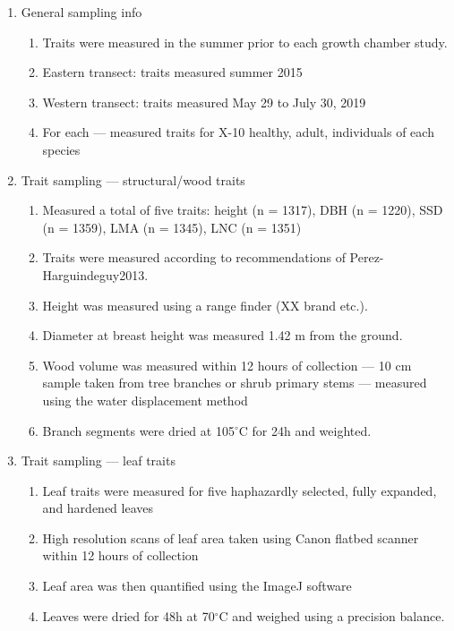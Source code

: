 \documentclass{article}
\begin{document}
\begin{enumerate}
\item General sampling info
\begin{enumerate}
\item Traits were measured in the summer prior to each growth chamber study.
\item Eastern transect: traits measured summer 2015 
\item Western transect: traits measured May 29 to July 30, 2019
\item For each --- measured traits for X-10 healthy, adult, individuals of each species
\end{enumerate}

\item Trait sampling --- structural/wood traits
\begin{enumerate}
\item Measured a total of five traits: height (n = 1317), DBH (n = 1220), SSD (n = 1359), LMA (n = 1345), LNC (n = 1351)
\item Traits were measured according to recommendations of Perez-Harguindeguy2013.
\item Height was measured using a range finder (XX brand etc.).
\item Diameter at breast height was measured 1.42 m from the ground.
\item Wood volume was measured within 12 hours of collection --- 10 cm sample taken from tree branches or shrub primary stems --- measured using the water displacement method
\item Branch segments were dried at 105$^{\circ}$C for 24h and weighted.
\end{enumerate}

\item Trait sampling --- leaf traits
\begin{enumerate}
\item Leaf traits were measured for five haphazardly selected, fully expanded, and hardened leaves 
\item High resolution scans of leaf area taken using Canon flatbed scanner within 12 hours of collection
\item Leaf area was then quantified using the ImageJ software
\item Leaves were dried for 48h at 70$^{\circ}$C and weighed using a precision balance.
\end{enumerate}
\end{enumerate}
\end{document}
